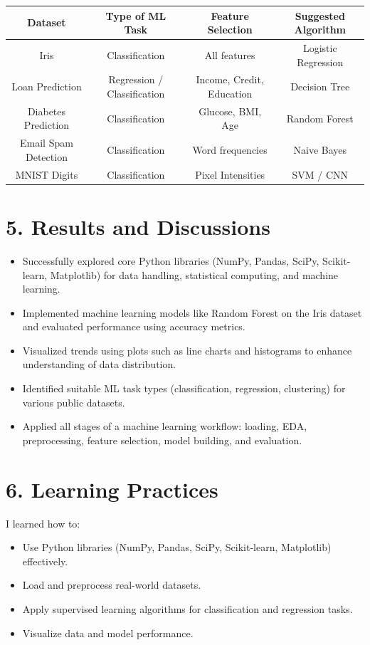 \documentclass[11pt]{article}
\begin{document}
\begin{table}[h!]
\centering
\renewcommand{\arraystretch}{1.3}
\begin{tabular}{|c|c|c|c|}
\hline
\textbf{Dataset} & \textbf{Type of ML Task} & \textbf{Feature Selection} & \textbf{Suggested Algorithm} \\
\hline
Iris & Classification & All features & Logistic Regression \\
Loan Prediction & Regression / Classification & Income, Credit, Education & Decision Tree \\
Diabetes Prediction & Classification & Glucose, BMI, Age & Random Forest \\
Email Spam Detection & Classification & Word frequencies & Naive Bayes \\
MNIST Digits & Classification & Pixel Intensities & SVM / CNN \\
\hline
\end{tabular}
\end{table}

\section*{5. Results and Discussions}

\begin{itemize}
    \item Successfully explored core Python libraries (NumPy, Pandas, SciPy, Scikit-learn, Matplotlib) for data handling, statistical computing, and machine learning.
    \item Implemented machine learning models like Random Forest on the Iris dataset and evaluated performance using accuracy metrics.
    \item Visualized trends using plots such as line charts and histograms to enhance understanding of data distribution.
    \item Identified suitable ML task types (classification, regression, clustering) for various public datasets.
    \item Applied all stages of a machine learning workflow: loading, EDA, preprocessing, feature selection, model building, and evaluation.
\end{itemize}


\section*{6. Learning Practices}
I learned how to:
\begin{itemize}
    \item Use Python libraries (NumPy, Pandas, SciPy, Scikit-learn, Matplotlib) effectively.
    \item Load and preprocess real-world datasets.
    \item Apply supervised learning algorithms for classification and regression tasks.
    \item Visualize data and model performance.
\end{itemize}
\end{document}
